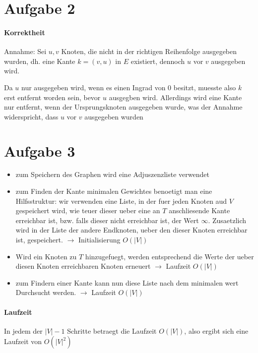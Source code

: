 




\newcommand{\nr}{7}


\section*{Aufgabe 2}
\paragraph{Korrektheit}
Annahme:
Sei $u,v$ Knoten, die nicht in der richtigen Reihenfolge ausgegeben wurden, dh. eine Kante $k = (v,u)$ in $E$ existiert,
dennoch $u$ vor $v$ ausgegeben wird.

Da $u$ nur ausgegeben wird, wenn es einen Ingrad von 0
besitzt, muesste also $k$ erst entfernt worden sein, bevor $u$ ausgegben wird.
Allerdings wird eine Kante nur entfernt, wenn der Ursprungsknoten
ausgegeben wurde, was der Annahme widerspricht, dass $u$ vor $v$ ausgegeben wurden

\section*{Aufgabe 3}
\begin{itemize}
\paragraph{Datenstrukturen}
\item zum Speichern des Graphen wird eine Adjuszenzliste verwendet
\item zum Finden der Kante minimalen Gewichtes benoetigt man eine Hilfsstruktur:
    wir verwenden eine Liste, in der fuer jeden Knoten aud $V$ gespeichert wird,
    wie teuer dieser ueber eine an $T$ anschliesende Kante erreichbar ist, bzw. 
    falls dieser nicht erreichbar ist, der Wert $\infty$. Zusaetzlich wird in der Liste
    der andere Endknoten, ueber den dieser Knoten erreichbar ist, gespeichert.
    $ \to $ Initialisierung $O(|V|)$
\item Wird ein Knoten zu $T$ hinzugefuegt, werden entsprechend die Werte der ueber diesen Knoten 
    erreichbaren Knoten erneuert $ \to $ Laufzeit $O(|V|)$
\item zum Findern einer Kante kann nun diese Liste nach dem minimalen wert Durchsucht werden.
     $ \to $ Laufzeit $O(|V|)$
\end{itemize}

\paragraph{Laufzeit}
In jedem der $|V|-1$ Schritte betraegt die Laufzeit $O(|V|)$, also ergibt sich eine Laufzeit von 
$O(|V|^2)$

